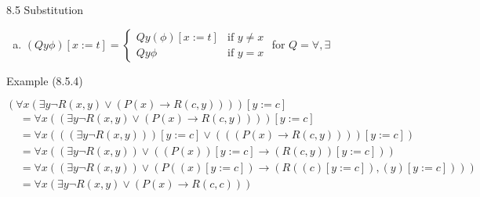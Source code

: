 \begin{frame}{8.5 Substitution}
\begin{itemize}
\begin{enumerate}[(i)]
\begin{enumerate}[(a)]
			\item $(Qy\phi)[x:=t]=\begin{cases} Qy(\phi)[x:=t] & \text{if } y\neq x\\ Qy\phi & \text{if }y=x\end{cases}$ for $Q=\forall,\exists$

			\end{enumerate}
	

			\end{enumerate}
	
	\end{itemize}

\end{frame}

\begin{frame}{Example (8.5.4)}

$(\forall x(\exists y \neg R(x,y)\lor (P(x)\to R(c,y))))[y:=c]$
	\begin{align*}
	&=\forall x((\exists y \neg R(x,y)\lor (P(x)\to R(c,y))))[y:=c]\\
	&=\forall x(((\exists y \neg R(x,y)))[y:=c]\lor (((P(x)\to R(c,y))))[y:=c])\\
	&=\forall x((\exists y \neg R(x,y))\lor ((P(x))[y:=c]\to (R(c,y))[y:=c]))\\
	&=\forall x((\exists y \neg R(x,y))\lor (P((x)[y:=c])\to (R((c)[y:=c]), (y)[y:=c])))\\
	&=\forall x(\exists y \neg R(x,y)\lor (P(x)\to R(c,c)))
	\end{align*}

\end{frame}

